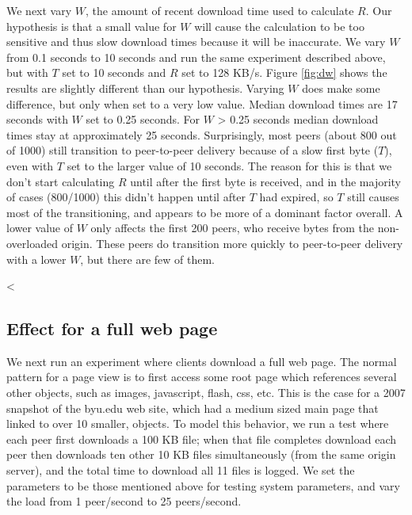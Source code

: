 We next vary $W$, the amount of recent download time used to calculate $R$. Our hypothesis is that 
a small value for $W$ will cause the calculation to be too sensitive and thus slow download times because it will be inaccurate. 
We vary $W$ from 0.1 seconds 
to 10 seconds and run the same experiment described above, but with $T$ set to 10 seconds and $R$ set to 128 KB/s. Figure \ref{fig:dw} shows the results are 
slightly different than our hypothesis. Varying $W$ does make some difference, but only when set 
to a very low value. Median download times are 17 seconds with $W$ set to 0.25 seconds. For $W$ \textgreater{} 0.25 seconds
median download times stay at approximately 25 seconds. Surprisingly, 
most peers (about 800 out of 1000) still transition to peer-to-peer delivery because of 
a slow first byte ($T$), even with $T$ set to the larger value of 10 seconds. 
The reason for this is that we don't start calculating $R$ until after the first byte is received, and 
in the majority of cases (800/1000) this didn't happen until after $T$ had expired, so $T$ still 
causes most of the transitioning, and appears to be more of a dominant factor overall.  A lower value of $W$ only affects the first 
200 peers, who receive bytes from the non-overloaded origin.  These peers do transition more quickly to peer-to-peer delivery with a lower $W$, but there are few of them.



<%

\subsection{Effect for a full web page}

We next run an experiment where clients download a full web page.  The normal pattern for a page view 
is to first access some root page which references several other objects, such as images, 
javascript, flash, css, etc. This is the case for a 2007 snapshot of the byu.edu web site, which had a medium sized main page that 
linked to over 10 smaller, objects.  To model this behavior, we run a test where each peer first 
downloads a 100 KB file; when that file completes download each peer then downloads ten other 10 KB files simultaneously 
(from the same origin server), and the total time to download all 11 files is logged. We set the parameters 
to be those mentioned above for testing system parameters, and vary the load from 1 peer/second to 25 peers/second. 

